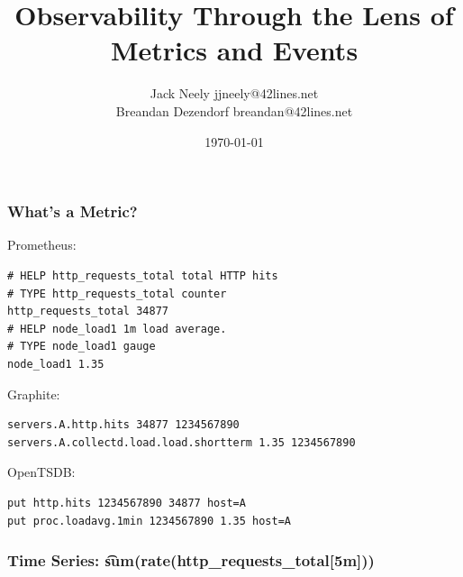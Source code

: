 

\title{Observability Through the Lens of\\Metrics and Events}
\author{Jack Neely jjneely@42lines.net\\Breandan Dezendorf breandan@42lines.net}

\date{\today}



\maketitle

\begin{frame}[fragile]
    \frametitle{What's a Metric?}

    Prometheus:
\begin{lstlisting}
# HELP http_requests_total total HTTP hits
# TYPE http_requests_total counter
http_requests_total 34877
# HELP node_load1 1m load average.
# TYPE node_load1 gauge
node_load1 1.35
\end{lstlisting}

    Graphite:
\begin{lstlisting}
servers.A.http.hits 34877 1234567890
servers.A.collectd.load.load.shortterm 1.35 1234567890
\end{lstlisting}

    OpenTSDB:
\begin{lstlisting}
put http.hits 1234567890 34877 host=A
put proc.loadavg.1min 1234567890 1.35 host=A
\end{lstlisting}
\end{frame}

\begin{frame}
    \frametitle{Time Series: \t{sum(rate(http\_requests\_total[5m]))}}
    \begin{center}

    \end{center}
\end{frame}


